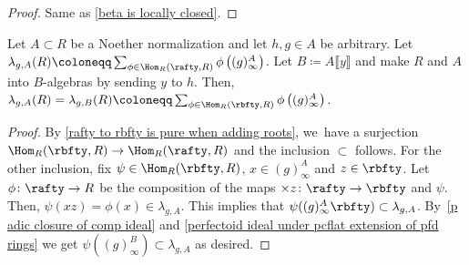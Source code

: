 \begin{proof}
Same as \autoref{beta is locally closed}.
\end{proof}

\begin{lemma}\label{trace does not depend on choice of A}
Let $A\subset R$ be a Noether normalization and let $h,g\in A$ be arbitrary. Let $\lambda_{g,A}(R)\coloneqq \sum_{\phi\in \Hom_R\left(\rafty,R\right)}\phi\left((g)^A_\infty\right)$. Let $B\coloneqq A\llbracket y\rrbracket$ and make $R$ and $A$ into $B$\nobreakdash-algebras by sending $y$ to $h$. Then, $\lambda_{g,A}(R)=\lambda_{g,B}(R)\coloneqq \sum_{\phi\in \Hom_R\left(\rbfty,R\right)}\phi\left((g)^A_\infty\right)$.
\end{lemma}

\begin{proof}
By \autoref{rafty to rbfty is pure when adding roots}, we~have a surjection $\Hom_R(\rbfty,R)\to \Hom_R(\rafty,R)$ and the inclusion $\subset$ follows. For the other inclusion, fix $\psi\in \Hom_R(\rbfty,R)$, $x\in (g)^A_\infty$ and $z\in \rbfty$. Let $\phi\colon \rafty\to R$ be the composition of the maps $\times z\colon \rafty\to \rbfty$ and $\psi$. Then, $\psi(xz)=\phi(x)\in \lambda_{g,A}$. This implies that $\psi((g)^A_\infty \rbfty)\subset \lambda_{g,A}$. By~\autoref{p adic closure of comp ideal} and \autoref{perfectoid ideal under pcflat extension of pfd rings} we get $\psi((g)^B_\infty)\subset \lambda_{g,A}$ as desired.
\end{proof}

